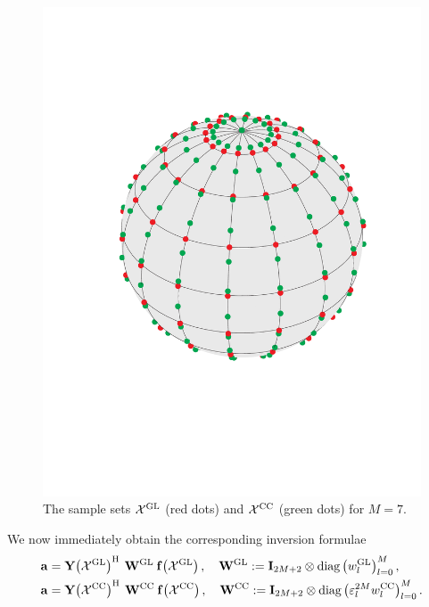 \begin{figure}[tb]
  \centering
  \includegraphics[width=12cm]{images/quadrature}
  \caption{The sample sets $\mathcal{X}^{\mbox{\scriptsize\rm{GL}}}$ (red dots) and $\mathcal{X}^{\mbox{\scriptsize\rm{CC}}}$ (green dots) for $M=7$.}
  \label{quadrature}
\end{figure}
We now immediately obtain the corresponding inversion formulae
\begin{equation}
  \label{NFSFT:InversionFormula}
  \begin{split}
    \V{a} & = \fun{\V{Y}}{\mathcal{X}^{\gl}}^{\h} \: \V{W}^{\gl} \: \fun{\V{f}}{\mathcal{X}^{\gl}},\quad \V{W}^{\gl} := \V{I}_{2M+2} \otimes \diag\paren{w_{l}^{\gl}}_{l=0}^M,\\
    \V{a} & = \fun{\V{Y}}{\mathcal{X}^{\cc}}^{\h} \: \V{W}^{\cc} \: \fun{\V{f}}{\mathcal{X}^{\cc}},\quad \V{W}^{\cc} := \V{I}_{2M+2} \otimes \diag\paren{\varepsilon_{l}^{2M}w_{l}^{\cc}}_{l=0}^M.
  \end{split}  
\end{equation}  
